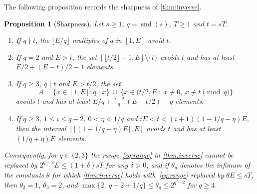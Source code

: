 \documentclass[11pt,reqno]{amsart}
\numberwithin{equation}{section}
\newtheorem{proposition}[theorem]{Proposition}
\theoremstyle{definition}
\theoremstyle{remark}
\newcommand{\floor}[1]{\lfloor #1\rfloor}
\newcommand{\ceil}[1]{\lceil #1\rceil}
\newcommand{\snd}{\operatorname{snd}}
\begin{document}
The following proposition records the sharpness of \cref{thm:inverse}.

\begin{proposition}[Sharpness]\label{prop:sharp}
Let $s\ge1$, $q=\snd(s)$, $T\ge1$ and $t=sT$.
\begin{enumerate}[label=\textup{(\alph*)}]
\item If $q\nmid t$, the $\floor{E/q}$ multiples of $q$ in $[1,E]$ avoid $t$.
\item If $q=2$ and $E>t$, the set $[\floor{t/2}+1,E]\setminus\{t\}$ avoids $t$ and has at least $E/2+(E-t)/2-1$ elements.
\item If $q\ge3$, $q\nmid t$ and $E>t/2$, the set
\[
 A=\{x\in[1,E]:q\mid x\}\ \cup\ \{x\in(t/2,E]:\ x\not\equiv0,\ x\not\equiv t\pmod q\}
\]
avoids $t$ and has at least $E/q+\frac{q-2}q\,(E-t/2)-q$ elements.
\item If $q\ge3$, $1\le i\le q-2$, $0<\eta<1/q$ and $iE<t<(i+1)(1-1/q-\eta)E$, then the interval $[\ceil{(1-1/q-\eta)E},E]$ avoids $t$ and has at least $(1/q+\eta)E$ elements.
\end{enumerate}
Consequently, for $q\in\{2,3\}$ the range~\eqref{eq:range} in \cref{thm:inverse} cannot be replaced by $2^{q-2}E\le(1+\delta)sT$ for any $\delta>0$; and if $\theta_q$ denotes the infimum of the constants $\theta$ for which \cref{thm:inverse} holds with~\eqref{eq:range} replaced by $\theta E\le sT$, then $\theta_2=1$, $\theta_3=2$, and $\max\{2,\ q-2+1/q\}\le\theta_q\le2^{q-2}$ for $q\ge4$.
\end{proposition}
\end{document}

